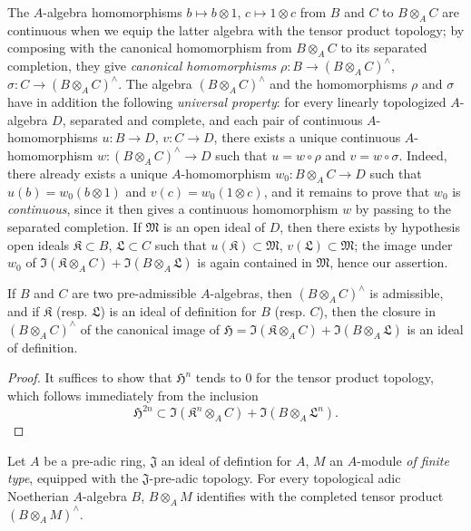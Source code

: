 \begin{env}[7.7.6]
\label{0.7.7.6}
The $A$-algebra homomorphisms $b\mapsto b\otimes 1$, $c\mapsto 1\otimes c$ from $B$ and $C$ to
$B\otimes_A C$ are continuous when we equip the latter algebra with the tensor product topology; by
composing with the canonical homomorphism from $B\otimes_A C$ to its separated completion, they
give {\em canonical homomorphisms} $\rho:B\to(B\otimes_A C)^\wedge$,
$\sigma:C\to(B\otimes_A C)^\wedge$. The algebra $(B\otimes_A C)^\wedge$ and the homomorphisms
$\rho$ and $\sigma$ have in addition the following {\em universal property}: for every linearly
topologized $A$-algebra $D$, separated and complete, and each pair of continuous $A$-homomorphisms
$u:B\to D$, $v:C\to D$, there exists a unique continuous $A$-homomorphism
$w:(B\otimes_A C)^\wedge\to D$ such that $u=w\circ\rho$ and $v=w\circ\sigma$. Indeed, there already
exists a unique $A$-homomorphism $w_0:B\otimes_A C\to D$ such that $u(b)=w_0(b\otimes 1)$ and
$v(c)=w_0(1\otimes c)$, and it remains to prove that $w_0$ is {\em continuous}, since it then
gives a
continuous homomorphism $w$ by passing to the separated completion. If $\mathfrak{M}$ is an open
ideal of $D$, then there exists by hypothesis open ideals $\mathfrak{K}\subset B$,
$\mathfrak{L}\subset C$ such that $u(\mathfrak{K})\subset\mathfrak{M}$,
$v(\mathfrak{L})\subset\mathfrak{M}$; the image under $w_0$ of
$\Im(\mathfrak{K}\otimes_A C)+\Im(B\otimes_A\mathfrak{L})$ is again contained in $\mathfrak{M}$,
hence our assertion.
\end{env}

\begin{prop}[7.7.7]
\label{0.7.7.7}
If $B$ and $C$ are two pre-admissible $A$-algebras, then $(B\otimes_A C)^\wedge$ is
admissible, and if $\mathfrak{K}$ (resp. $\mathfrak{L}$) is an ideal of definition for
$B$ (resp. $C$), then the closure in $(B\otimes_A C)^\wedge$ of the canonical image of
$\mathfrak{H}=\Im(\mathfrak{K}\otimes_A C)+\Im(B\otimes_A\mathfrak{L})$ is an ideal of
definition.
\end{prop}

\begin{proof}
\label{proof-0.7.7.7}
It suffices to show that $\mathfrak{H}^n$ tends to $0$ for the tensor product topology, which follows
immediately from the inclusion
\[
  \mathfrak{H}^{2n}\subset\Im(\mathfrak{K}^n\otimes_A C)+\Im(B\otimes_A\mathfrak{L}^n).
\]
\end{proof}

\begin{prop}[7.7.8]
\label{0.7.7.8}
Let $A$ be a pre-adic ring, $\mathfrak{J}$ an ideal of defintion for $A$, $M$ an $A$-module
{\em of finite type}, equipped with the $\mathfrak{J}$-pre-adic topology. For every topological
adic Noetherian $A$-algebra $B$, $B\otimes_A M$ identifies with the completed tensor product
$(B\otimes_A M)^\wedge$.
\end{prop}

